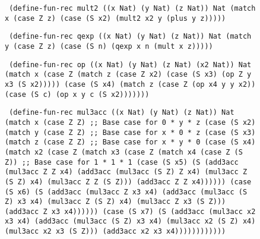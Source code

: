 \begin{figure}
  \texttt{
    (define-fun-rec mult2 ((x Nat) (y Nat) (z Nat)) Nat
      (match x
        (case  Z z)
        (case (S x2)
          (mult2 x2 y (plus y z)))))
  }

  \texttt{
    (define-fun-rec qexp ((x Nat) (y Nat) (z Nat)) Nat
      (match y
        (case  Z z)
        (case (S n)
          (qexp x n (mult x z)))))
  }

  \texttt{
    (define-fun-rec op ((x Nat) (y Nat) (z Nat) (x2 Nat)) Nat
      (match x
        (case Z
          (match z
            (case  Z x2)
            (case (S x3)
              (op Z y x3 (S x2)))))
        (case (S x4)
          (match z
            (case Z
              (op x4 y y x2))
            (case (S c)
              (op x y c (S x2)))))))
  }

  \texttt{
    (define-fun-rec mul3acc ((x Nat) (y Nat) (z Nat)) Nat
      (match x
        (case  Z Z)                         ;; Base case for 0 * y * z
        (case (S x2)
          (match y
            (case  Z Z)                     ;; Base case for x * 0 * z
            (case (S x3)
              (match z
                (case  Z Z)                 ;; Base case for x * y * 0
                (case (S x4)
                  (match x2
                    (case Z
                      (match x3
                        (case Z
                          (match x4
                            (case Z (S Z))  ;; Base case for 1 * 1 * 1
                            (case (S x5)
                              (S (add3acc (mul3acc Z Z x4)
                                          (add3acc (mul3acc (S Z) Z x4)
                                                   (mul3acc Z (S Z) x4)
                                                   (mul3acc Z Z (S Z)))
                                          (add3acc Z Z x4))))))
                        (case (S x6)
                          (S (add3acc (mul3acc Z x3 x4)
                                      (add3acc (mul3acc (S Z) x3 x4)
                                               (mul3acc Z (S Z) x4)
                                               (mul3acc Z x3 (S Z)))
                                      (add3acc Z x3 x4))))))
                    (case (S x7)
                      (S (add3acc (mul3acc x2 x3 x4)
                                  (add3acc (mul3acc (S Z) x3 x4)
                                           (mul3acc x2 (S Z) x4)
                                           (mul3acc x2 x3 (S Z)))
                                  (add3acc x2 x3 x4))))))))))))
  }


\end{figure}
